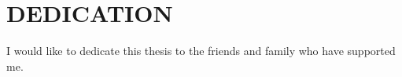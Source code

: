 \chapter*{DEDICATION}

I would like to dedicate this thesis to the friends and family who have supported me.
